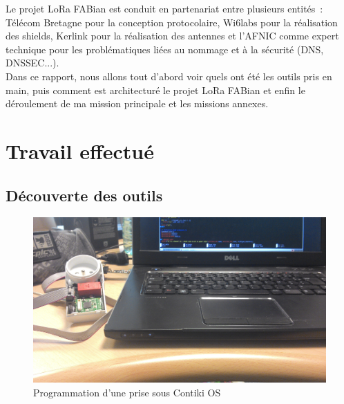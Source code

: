 \documentclass{article}
\begin{document}
Le projet LoRa FABian est conduit en partenariat entre plusieurs entités~: Télécom Bretagne pour la conception protocolaire, Wi6labs pour la réalisation des shields, Kerlink pour la réalisation des antennes et l'AFNIC comme expert technique pour les problématiques liées au nommage et à la sécurité (DNS, DNSSEC...).\\
Dans ce rapport, nous allons tout d'abord voir quels ont été les outils pris en main, puis comment est architecturé le projet LoRa FABian et enfin le déroulement de ma mission principale et les missions annexes.

\section{Travail effectué}
\subsection{Découverte des outils}

	\begin{figure}[h]
		\begin{center}
			\includegraphics[scale=0.08]{../res/img/progprise.jpg}
			\caption{Programmation d'une prise sous Contiki OS}
			\label{fig:progprise}
		\end{center}
	\end{figure}
\end{document}
